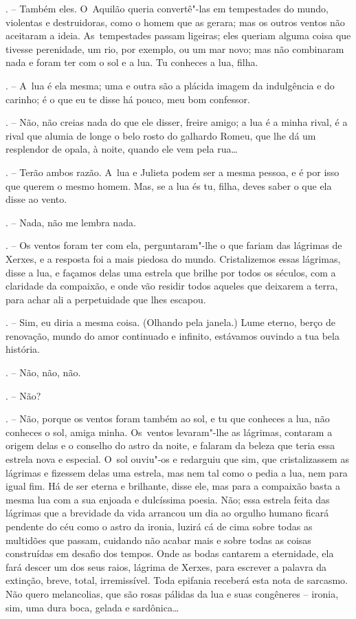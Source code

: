 \begin{Parskip}
. -- Também eles. O~Aquilão queria convertê"-las em tempestades
do mundo, violentas e destruidoras, como o homem que as gerara; mas os
outros ventos não aceitaram a ideia. As~tempestades passam ligeiras;
eles queriam alguma coisa que tivesse perenidade, um rio, por exemplo,
ou um mar novo; mas não combinaram nada e foram ter com o sol e a lua.
Tu conheces a lua, filha.

. -- A~lua é ela mesma; uma e outra são a plácida imagem da
indulgência e do carinho; é o que eu te disse há pouco, meu bom
confessor.

. -- Não, não creias nada do que ele disser, freire amigo; a lua
é a minha rival, é a rival que alumia de longe o belo rosto do galhardo
Romeu, que lhe dá um resplendor de opala, à noite, quando ele vem pela
rua\ldots{}

. -- Terão ambos razão. A~lua e Julieta podem ser a mesma
pessoa, e é por isso que querem o mesmo homem. Mas, se a lua és tu,
filha, deves saber o que ela disse ao vento.

. -- Nada, não me lembra nada.

. -- Os ventos foram ter com ela, perguntaram"-lhe o que
fariam das lágrimas de Xerxes, e a resposta foi a mais piedosa do mundo.
Cristalizemos essas lágrimas, disse a lua, e façamos delas uma estrela
que brilhe por todos os séculos, com a claridade da compaixão, e onde
vão residir todos aqueles que deixarem a terra, para achar ali a
perpetuidade que lhes escapou.

. -- Sim, eu diria a mesma coisa. (Olhando pela janela.) Lume
eterno, berço de renovação, mundo do amor continuado e infinito,
estávamos ouvindo a tua bela história.

. -- Não, não, não.

. -- Não?

. -- Não, porque os ventos foram também ao sol, e tu que
conheces a lua, não conheces o sol, amiga minha. Os~ventos levaram"-lhe
as lágrimas, contaram a origem delas e o conselho do astro da noite, e
falaram da beleza que teria essa estrela nova e especial. O~sol ouviu"-os
e redarguiu que sim, que cristalizassem as lágrimas e fizessem delas uma
estrela, mas nem tal como o pedia a lua, nem para igual fim. Há de ser
eterna e brilhante, disse ele, mas para a compaixão basta a mesma lua
com a sua enjoada e dulcíssima poesia. Não; essa estrela feita das
lágrimas que a brevidade da vida arrancou um dia ao orgulho humano
ficará pendente do céu como o astro da ironia, luzirá cá de cima sobre
todas as multidões que passam, cuidando não acabar mais e sobre todas as
coisas construídas em desafio dos tempos. Onde as bodas cantarem a
eternidade, ela fará descer um dos seus raios, lágrima de Xerxes, para
escrever a palavra da extinção, breve, total, irremissível. Toda
epifania receberá esta nota de sarcasmo. Não quero melancolias, que são
rosas pálidas da lua e suas congêneres -- ironia, sim, uma dura boca,
gelada e sardônica\ldots{}


\end{Parskip}
